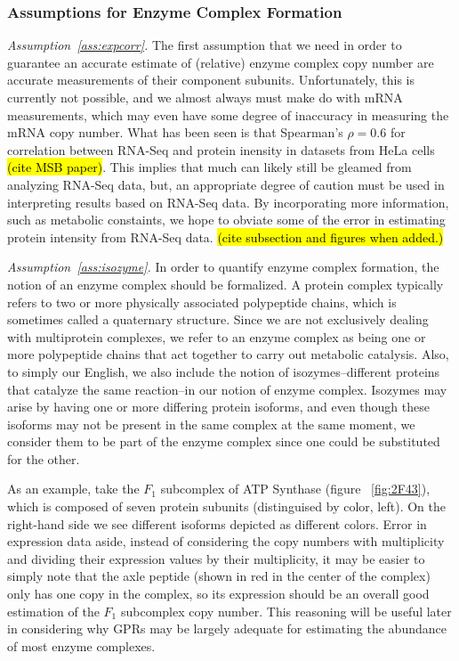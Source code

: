 \subsubsection{Assumptions for Enzyme Complex Formation}
\emph{Assumption~\ref{ass:expcorr}.}
The first assumption that we need in order to guarantee an accurate
estimate of (relative) enzyme complex copy number are accurate
measurements of their component subunits. Unfortunately, this is
currently not possible, and we almost always must make do with mRNA
measurements, which may even have some degree of inaccuracy in
measuring the mRNA copy number. What has been seen is that Spearman's
$\rho = 0.6$ for correlation between RNA-Seq and protein inensity in
datasets from HeLa cells \hl{(cite MSB paper)}. This implies that much
can likely still be gleamed from analyzing RNA-Seq data, but, an
appropriate degree of caution must be used in interpreting results
based on RNA-Seq data. By incorporating more information, such as
metabolic constaints, we hope to obviate some of the error in
estimating protein intensity from RNA-Seq data. \hl{(cite subsection
and figures when added.)}

\emph{Assumption~\ref{ass:isozyme}.}
In order to quantify enzyme complex formation, the notion of an enzyme
complex should be formalized.
A protein complex typically refers to two or more physically associated polypeptide chains, which is
sometimes called a quaternary structure. Since we
are not exclusively dealing with multiprotein complexes, we refer to an enzyme complex as being
one or more polypeptide chains that act together to carry out metabolic catalysis. Also, to simply
our English, we also include the notion of isozymes--different proteins that catalyze the 
same reaction--in our notion of enzyme complex. Isozymes may arise by having one or more differing
protein isoforms, and even though these isoforms may not be present in the same complex at the same
moment, we consider them to be part of the enzyme complex since one could be substituted for the other.

As an example, take the $F_1$ subcomplex of ATP Synthase (figure
~\ref{fig:2F43}), which is composed of seven protein subunits
(distinguised by color, left). On the right-hand side we see different
isoforms depicted as different colors.  Error in expression data
aside, instead of considering the copy numbers with multiplicity and
dividing their expression values by their multiplicity, it may be
easier to simply note that the axle peptide (shown in red in the
center of the complex) only has one copy in the complex, so its
expression should be an overall good estimation of the $F_1$ subcomplex
copy number. This reasoning will be useful later in considering why
GPRs may be largely adequate for estimating the abundance of most
enzyme complexes.

